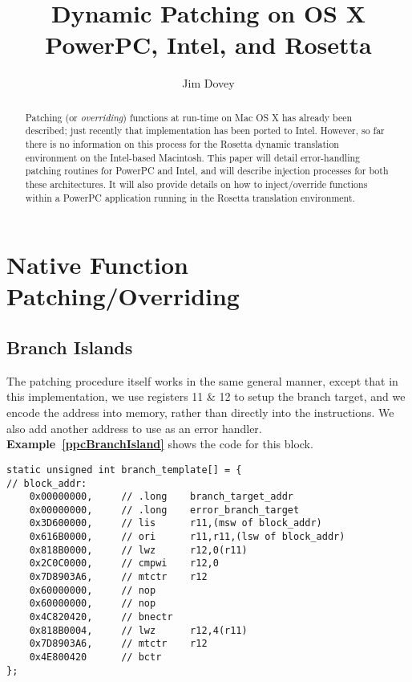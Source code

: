 \documentclass[english]{article}
\begin{document}
\title{Dynamic Patching on OS X PowerPC, Intel, and Rosetta}
\author{Jim Dovey}
\maketitle

\begin{abstract}
Patching (or \emph{overriding}) functions at run-time on Mac OS X has already been described\cite{rentzsch03}; just recently that implementation has been ported to Intel\cite{guiheneuf06}. However, so far there is no information on this process for the Rosetta dynamic translation environment on the Intel-based Macintosh. This paper will detail error-handling patching routines for PowerPC and Intel, and will describe injection processes for both these architectures. It will also provide details on how to inject/override functions within a PowerPC application running in the Rosetta translation environment.
\end{abstract}

\tableofcontents

\section{Native Function Patching/Overriding}
\subsection{Branch Islands}
The patching procedure itself works in the same general manner, except that in this implementation, we use registers 11 \& 12 to setup the branch target, and we encode the address into memory, rather than directly into the instructions. We also add another address to use as an error handler. \textbf{Example~\ref{ppcBranchIsland}} shows the code for this block.

\begin{lstlisting}[caption=Both branch islands on PowerPC are based on this template, label=ppcBranchIsland]
static unsigned int branch_template[] = {
// block_addr:
    0x00000000,     // .long    branch_target_addr
    0x00000000,     // .long    error_branch_target
    0x3D600000,     // lis      r11,(msw of block_addr)
    0x616B0000,     // ori      r11,r11,(lsw of block_addr)
    0x818B0000,     // lwz      r12,0(r11)
    0x2C0C0000,     // cmpwi    r12,0
    0x7D8903A6,     // mtctr    r12
    0x60000000,     // nop
    0x60000000,     // nop
    0x4C820420,     // bnectr
    0x818B0004,     // lwz      r12,4(r11)
    0x7D8903A6,     // mtctr    r12
    0x4E800420      // bctr
};
\end{lstlisting}
\end{document}
